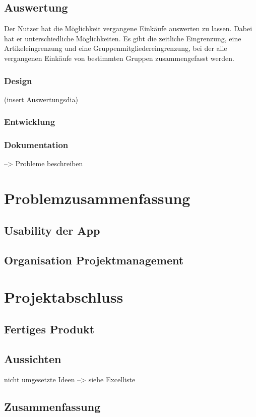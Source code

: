 \documentclass[12pt,a4paper]{article}
\begin{document}
\subsection{Auswertung}
Der Nutzer hat die Möglichkeit vergangene Einkäufe auswerten zu lassen. Dabei hat er unterschiedliche Möglichkeiten.  Es gibt die zeitliche Eingrenzung, eine Artikeleingrenzung und eine Gruppenmitgliedereingrenzung, bei der alle vergangenen Einkäufe von bestimmten Gruppen zusammengefasst werden.
\subsubsection*{Design}
(insert Auswertungsdia)
\subsubsection*{Entwicklung}

\subsubsection*{Dokumentation} --> Probleme beschreiben
\newpage

\section{Problemzusammenfassung}
\subsection{Usability der App}
\newpage
\subsection{Organisation Projektmanagement}
\newpage
\section{Projektabschluss}
\subsection{Fertiges Produkt}
\subsection{Aussichten}
nicht umgesetzte Ideen --> siehe Excelliste
\newpage
\subsection{Zusammenfassung}
\newpage
\end{document}
